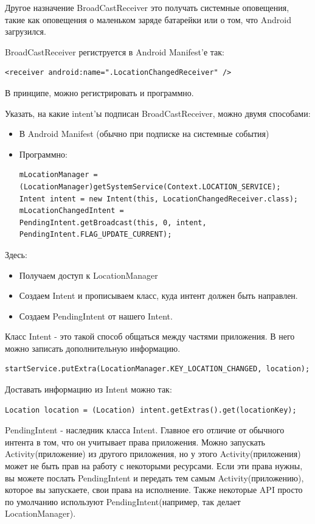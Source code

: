 \documentclass[12 pt]{article}
\begin{document}
    Другое назначение BroadCastReceiver это получать системные оповещения, такие как оповещения о маленьком заряде батарейки или о том, что Android загрузился.
    
    BroadCastReceiver региструется в Android Manifest'е так:
    \begin{lstlisting}
<receiver android:name=".LocationChangedReceiver" />
    \end{lstlisting} 
    
    В принципе, можно регистрировать и программно.
    
    Указать, на какие intent'ы подписан BroadCastReceiver, можно двумя способами:
	\begin{itemize}
    	\item В Android Manifest (обычно при подписке на системные события)
		\item Программно:
        \begin{lstlisting}
mLocationManager = (LocationManager)getSystemService(Context.LOCATION_SERVICE);
Intent intent = new Intent(this, LocationChangedReceiver.class);
mLocationChangedIntent =
PendingIntent.getBroadcast(this, 0, intent, PendingIntent.FLAG_UPDATE_CURRENT);
    \end{lstlisting}
    \end{itemize}
     Здесь:
	\begin{itemize}
    \item Получаем доступ к LocationManager
	\item Создаем Intent и прописываем класс, куда интент должен быть направлен.
	\item Создаем PendingIntent от нашего Intent.
    \end{itemize}
	Класс Intent - это такой способ общаться между частями приложения. В него можно записать дополнительную информацию.
        \begin{lstlisting}
startService.putExtra(LocationManager.KEY_LOCATION_CHANGED, location);
        \end{lstlisting}        
        
    Доставать информацию из Intent можно так:
        \begin{lstlisting}
Location location = (Location) intent.getExtras().get(locationKey);
        \end{lstlisting}
    PendingIntent - наследник класса Intent. Главное его отличие от обычного интента в том, что он учитывает права приложения. Можно запускать Activity(приложение) из другого приложения, но у этого Activity(приложения) может не быть прав на работу с некоторыми ресурсами. Если эти права нужны, вы можете послать PendingIntent и передать тем самым Activity(приложению), которое вы запускаете, свои права на исполнение. Также некоторые API просто по умолчанию используют PendingIntent(например, так делает LocationManager). 
    
\end{document}
